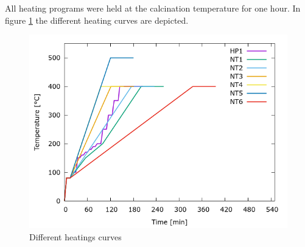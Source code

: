 \documentclass[a4paper]{article}
\newcommand{\td}[1]{\textcolor{red}{#1}}
\newcommand{\minutes}[1]{\SI{#1}{\minute}}
\newcommand{\oc}[1]{\SI{#1}{\degreeCelsius}}
\begin{document}
All heating programs were held at the calcination temperature for one hour.
In figure \ref{fig:heat} the different heating curves are depicted. 
%
%

\begin{figure}
	\centering
	\includegraphics[width=.7\textwidth]{../Data/Graphs/hp1.png}
	\caption{Different heatings curves}
	\label{fig:heat}
\end{figure}
\end{document}
